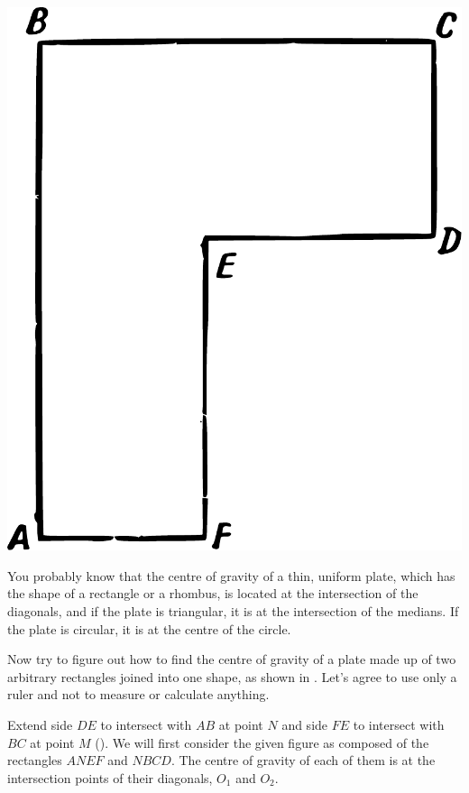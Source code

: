 \begin{marginfigure}[-1cm]%
\centering
\includegraphics[width=\textwidth]{figures/ch-10/fig-143.pdf}
\end{marginfigure}


\ques You probably know that the centre of gravity of a thin, uniform plate, which has the shape of a rectangle or a rhombus, is located at the intersection of the diagonals, and if the plate is triangular, it is at the intersection of the medians. If the plate is circular, it is at the centre of the circle.





Now try to figure out how to find the centre of gravity of a plate made up of two arbitrary rectangles joined into one shape, as shown in . Let's agree to use only a ruler and not to measure or calculate anything.


\ans Extend side $DE$ to intersect with $AB$ at point $N$ and side $FE$ to intersect with $BC$ at point $M$ (). We will first consider the given figure as composed of the rectangles $ANEF$ and $NBCD$. The centre of gravity of each of them is at the intersection points of their diagonals, $O_{1}$ and $O_{2}$.


